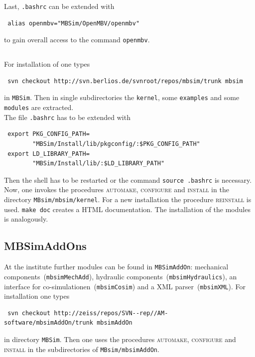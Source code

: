 Last, \texttt{.bashrc} can be extended with
\begin{verbatim}
 alias openmbv="MBSim/OpenMBV/openmbv"
\end{verbatim}
to gain overall access to the command \texttt{openmbv}.

\subsection{\MBSim}
For installation of \MBSim{} one types
\begin{verbatim}
 svn checkout http://svn.berlios.de/svnroot/repos/mbsim/trunk mbsim
\end{verbatim}
in \texttt{MBSim}. Then in single subdirectories the \texttt{kernel}, some \texttt{examples} and some \texttt{modules} are extracted.\\
The file \texttt{.bashrc} has to be extended with
\begin{verbatim}
 export PKG_CONFIG_PATH=
        "MBSim/Install/lib/pkgconfig/:$PKG_CONFIG_PATH"
 export LD_LIBRARY_PATH=
        "MBSim/Install/lib/:$LD_LIBRARY_PATH"
\end{verbatim}
Then the shell has to be restarted or the command \texttt{source .bashrc} is necessary.\\
Now, one invokes the procedures \textsc{automake, configure} and \textsc{install} in the directory \texttt{MBsim/mbsim/kernel}. For a new installation the procedure \textsc{reinstall} is used. \texttt{make doc} creates a HTML documentation. The installation of the modules is analogously.

\subsection{MBSimAddOns}
{\small At the institute further modules can be found in \texttt{MBSimAddOn}: mechanical components~(\texttt{mbsimMechAdd}), hydraulic components~(\texttt{mbsimHydraulics}), an interface for co-simulationen~(\texttt{mbsimCosim}) and a XML parser~(\texttt{mbsimXML}). For installation one types
\begin{verbatim}
 svn checkout http://zeiss/repos/SVN--rep//AM-software/mbsimAddOn/trunk mbsimAddOn
\end{verbatim}
in directory \texttt{MBSim}. Then one uses the procedures \textsc{automake, configure} and \textsc{install} in the subdirectories of \texttt{MBsim/mbsimAddOn}.
}

